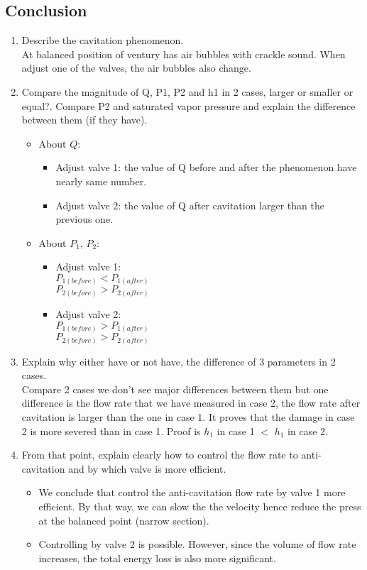 \subsection{Conclusion}
\begin{enumerate}[label=\alph*)]
	\item Describe the cavitation phenomenon.\\
	At balanced position of ventury has air bubbles with crackle sound. When adjust one of the valves, the air bubbles also change.
	\item Compare the magnitude of Q, P1, P2 and h1 in 2 cases, larger or smaller or equal?. Compare P2 and saturated vapor pressure and explain the difference between them (if they have).
	\begin{itemize}[label=-]
		\item About $Q$:
		\begin{itemize}[label=+]
			\item Adjust valve 1: the value of Q before and after the phenomenon have nearly same number.
			\item Adjust valve 2: the value of Q after cavitation larger than the previous one.
		\end{itemize}
		\item About $P_1$, $P_2$:
		\begin{itemize}[label=+]
			\item Adjust valve 1:\\
			$P_{1(before)}<P_{1(after)}$\\
			$P_{2(before)}>P_{2(after)}$
			\item Adjust valve 2:\\
			$P_{1(before)}>P_{1(after)}$\\
			$P_{2(before)}>P_{2(after)}$
		\end{itemize}
		
	\end{itemize}
	\item Explain why either have or not have, the difference of 3 parameters in 2 cases.\\
	Compare 2 cases we don’t see major differences between them but one difference is the flow rate that we have measured in case 2, the flow rate after cavitation is larger than the one in case 1. It proves that the damage in case 2 is more severed than in case 1. Proof is $h_1$ in case 1 $<$ $h_1$ in case 2.
	\item From that point, explain clearly how to control the flow rate to anti-cavitation and by which valve is more efficient.
	\begin{itemize}[label=-]
		\item We conclude that control the anti-cavitation flow rate  by valve 1 more efficient. By that way, we can slow the the velocity hence reduce the press at the balanced point (narrow section).
		\item Controlling by valve 2 is possible. However, since the volume of flow rate increases, the total energy loss is also more significant.
	\end{itemize}
	
\end{enumerate}
